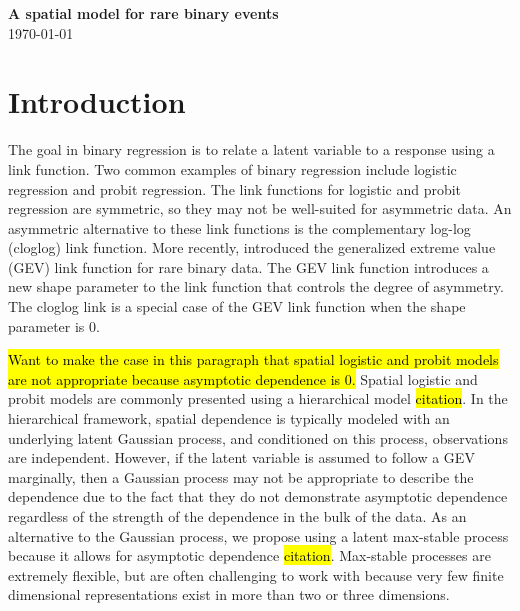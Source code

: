 \documentclass[11pt]{article}
\begin{document}
\linenumbers

\begin{center}
{\Large {\bf A spatial model for rare binary events}}\\
\today
\end{center}

\section{Introduction}\label{s:intro}

The goal in binary regression is to relate a latent variable to a response using a link function.
Two common examples of binary regression include logistic regression
and probit regression.
The link functions for logistic and probit regression are symmetric, so they may not be well-suited for asymmetric data.
An asymmetric alternative to these link functions is the complementary log-log (cloglog) link function.
More recently, \citet{Wang2010} introduced the generalized extreme value (GEV) link function for rare binary data.
The GEV link function introduces a new shape parameter to the link function that controls the degree of asymmetry.
The cloglog link is a special case of the GEV link function when the shape parameter is 0.

\hl{Want to make the case in this paragraph that spatial logistic and probit models are not appropriate because asymptotic dependence is 0.}
Spatial logistic and probit models are commonly presented using a hierarchical model \hl{citation}.
In the hierarchical framework, spatial dependence is typically modeled with an underlying latent Gaussian process, and conditioned on this process, observations are independent.
However, if the latent variable is assumed to follow a GEV marginally, then a Gaussian process may not be appropriate to describe the dependence due to the fact that they do not demonstrate asymptotic dependence regardless of the strength of the dependence in the bulk of the data.
As an alternative to the Gaussian process, we propose using a latent max-stable process because it allows for asymptotic dependence \hl{citation}.
Max-stable processes are extremely flexible, but are often challenging to work with because very few finite dimensional representations exist in more than two or three dimensions.
\end{document}
